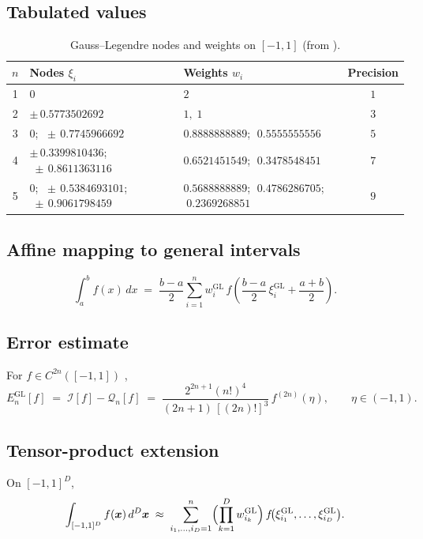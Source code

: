\documentclass[11pt,a4paper]{article}
\theoremstyle{definition}
\newcommand{\I}{\mathcal{I}}
\newcommand{\Q}{\mathcal{Q}}
\newcommand{\GL}{\mathrm{GL}}
\begin{document}
\subsection{Tabulated values}

\begin{table}[ht]
\centering
\caption{Gauss--Legendre nodes and weights on $[-1,1]$ (from
\cite[Table~25.4]{AbramowitzStegun1972}).}
\label{tab:GL-table}
\begin{tabular}{c l l c}
\toprule
$n$ & Nodes $\xi_i$ & Weights $w_i$ & Precision \\
\midrule
1 & $0$
  & $2$
  & $1$ \\
2 & $\pm\,0.5773502692$
  & $1,\;1$
  & $3$ \\
3 & $0$; $\;\pm\,0.7745966692$
  & $0.8888888889$; $\;0.5555555556$
  & $5$ \\
4 & $\pm\,0.3399810436$; $\;\pm\,0.8611363116$
  & $0.6521451549$; $\;0.3478548451$
  & $7$ \\
5 & $0$; $\;\pm\,0.5384693101$; $\;\pm\,0.9061798459$
  & $0.5688888889$; $\;0.4786286705$; $\;0.2369268851$
  & $9$ \\
\bottomrule
\end{tabular}
\end{table}

\subsection{Affine mapping to general intervals}

\[
  \int_a^b f(x)\,dx \;=\; \frac{b-a}{2}\sum_{i=1}^n w_i^{\GL}\,
        f\!\left(\frac{b-a}{2}\,\xi_i^{\GL}+\frac{a+b}{2}\right).
\]

\subsection{Error estimate}

For $f\in C^{2n}([-1,1])$ \cite[Eq.~(2.7.12)]{DavisRabinowitz1984},
\begin{equation}
  E_n^{\GL}[f] \;=\; \I[f]-\Q_n[f]
   \;=\; \frac{2^{2n+1}(n!)^4}{(2n+1)\,[(2n)!]^3}\,f^{(2n)}(\eta),
   \qquad \eta\in(-1,1).
   \label{eq:GL-error}
\end{equation}

\subsection{Tensor-product extension}

On $[-1,1]^D$,
\[
  \int_{[-1,1]^D} f(\bm{x})\,d^D\bm{x}
  \;\approx\;
  \sum_{i_1,\ldots,i_D=1}^{n}
  \Bigl(\prod_{k=1}^{D} w_{i_k}^{\GL}\Bigr)\,
  f\!\bigl(\xi_{i_1}^{\GL},\ldots,\xi_{i_D}^{\GL}\bigr).
\]
\end{document}
